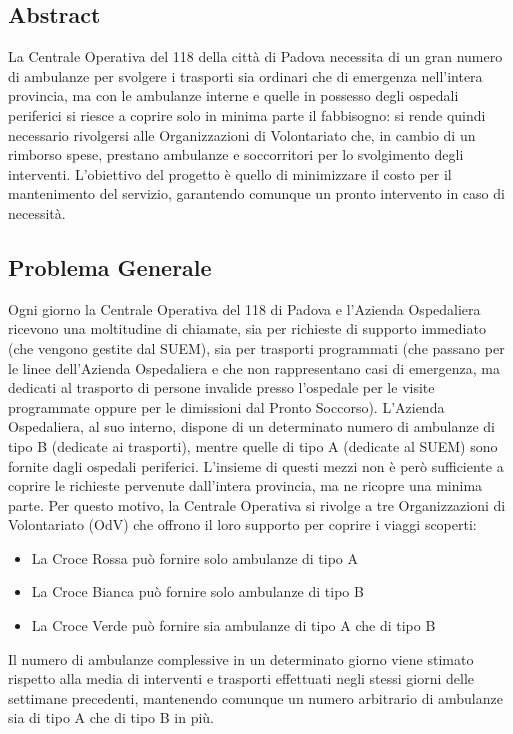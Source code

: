 \subsection{Abstract}
La Centrale Operativa del 118 della città di Padova necessita di un gran numero di ambulanze per svolgere i trasporti sia ordinari che di emergenza nell’intera provincia, ma con le ambulanze interne e quelle in possesso degli ospedali periferici si riesce a coprire solo in minima parte il fabbisogno: si rende quindi necessario rivolgersi alle Organizzazioni di Volontariato che, in cambio di un rimborso spese, prestano ambulanze e soccorritori per lo svolgimento degli interventi. 
L’obiettivo del progetto è quello di minimizzare il costo per il mantenimento del servizio, garantendo comunque un pronto intervento in caso di necessità. 

\subsection{Problema Generale}
Ogni giorno la Centrale Operativa del 118 di Padova e l'Azienda Ospedaliera ricevono una moltitudine di chiamate, sia per richieste di supporto immediato (che vengono gestite dal SUEM), sia per trasporti programmati (che passano per le linee dell'Azienda Ospedaliera e che non rappresentano casi di emergenza, ma dedicati al trasporto di persone invalide presso l'ospedale per le visite programmate oppure per le dimissioni dal Pronto Soccorso).
\newline \newline
L'Azienda Ospedaliera, al suo interno, dispone di un determinato numero di ambulanze di tipo B (dedicate ai trasporti), mentre quelle di tipo A (dedicate al SUEM) sono fornite dagli ospedali periferici. L'insieme di questi mezzi non è però sufficiente a coprire le richieste pervenute dall'intera provincia, ma ne ricopre una minima parte. Per questo motivo, la Centrale Operativa si rivolge a tre Organizzazioni di Volontariato (OdV) che offrono il loro supporto per coprire i viaggi scoperti:
\begin{itemize}
    \item La Croce Rossa può fornire solo ambulanze di tipo A
    \item La Croce Bianca può fornire solo ambulanze di tipo B
    \item La Croce Verde può fornire sia ambulanze di tipo A che di tipo B
\end{itemize}
Il numero di ambulanze complessive in un determinato giorno viene stimato rispetto alla media di interventi e trasporti effettuati negli stessi giorni delle settimane precedenti, mantenendo comunque un numero arbitrario di ambulanze sia di tipo A che di tipo B in più.
